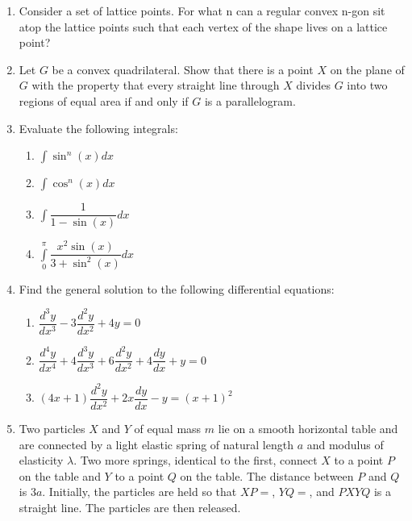 \documentclass{article}
\begin{document}
\begin{enumerate}

	\item
	Consider a set of lattice points. For what n can a regular convex n-gon sit atop the lattice points such that each vertex of the shape lives on a lattice point?
    
    \item Let $G$ be a convex quadrilateral. Show that there is a point $X$ on the plane of $G$ with the property that every straight line through $X$ divides $G$ into two regions of equal area if and only if $G$ is a parallelogram.

	\item
	Evaluate the following integrals:
	\begin{enumerate}
	    \item $\int \sin^{n}(x) dx$
	    \item $\int \cos^{n}(x) dx$
	    \item $\int \dfrac{1}{1 - \sin(x)}dx$
	    \item $\int\limits_{0}^{\pi}\dfrac{x^{2}\sin(x)}{3 + \sin^2(x)}dx$
	\end{enumerate}

	\item
	Find the general solution to the following differential equations:
	\begin{enumerate}
	    \item $\dfrac{d^{3}y}{dx^{3}} - 3\dfrac{d^{2}y}{dx^{2}} + 4y = 0$\\
	    \item $\dfrac{d^{4}y}{dx^{4}} + 4\dfrac{d^{3}y}{dx^{3}} + 6\dfrac{d^{2}y}{dx^{2}} + 4\dfrac{dy}{dx} + y = 0$\\
	    \item $(4x+1)\dfrac{d^{2}y}{dx^{2}}+2x\dfrac{dy}{dx}-y=(x+1)^{2}$
	\end{enumerate}


    \item
    Two particles $X$ and $Y$ of equal mass $m$ lie on a smooth horizontal table and are connected by a light elastic spring of natural length $a$ and modulus of elasticity $\lambda$. Two more springs, identical to the first, connect $X$ to a point $P$ on the table and $Y$ to a point $Q$ on the table. The distance between $P$ and $Q$ is $3a$. Initially, the particles are held so that $XP = $, $YQ = $, and $PXYQ$ is a straight line. The particles are then released.
    

\end{enumerate}
\end{document}
